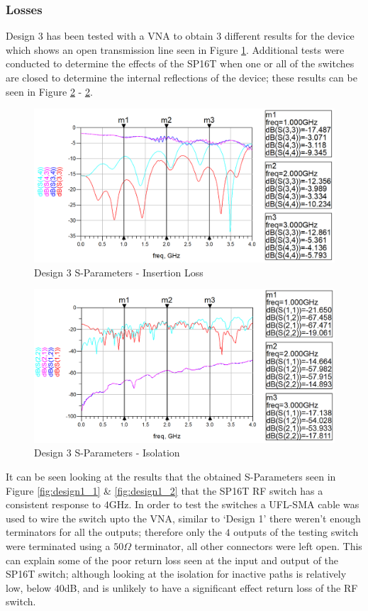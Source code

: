 \documentclass[12pt,openany,a4paper]{book}
\begin{document}
\subsubsection{Losses}
Design 3 has been tested with a VNA to obtain $3$ different results for the device which shows an open transmission line seen in Figure \ref{fig:design3_1}. Additional tests were conducted to determine the effects of the SP16T when one or all of the switches are closed to determine the internal reflections of the device; these results can be seen in Figure \ref{fig:design3_2} - \ref{fig:design3_2}. 
\begin{figure}[H]
	\centering
	\includegraphics[width=1\textwidth]{design3-open.png}
	\caption{Design 3 S-Parameters - Insertion Loss}
	\label{fig:design3_1}
\end{figure} 
\begin{figure}[H]
	\centering
	\includegraphics[width=1\textwidth]{design3.png}
	\caption{Design 3 S-Parameters - Isolation}
	\label{fig:design3_2}
\end{figure} 
It can be seen looking at the results that the obtained S-Parameters seen in Figure \ref{fig:design1_1} \& \ref{fig:design1_2} that the SP16T RF switch has a consistent response to $4$GHz. In order to test the switches a UFL-SMA cable was used to wire the switch upto the VNA, similar to `Design 1' there weren't enough terminators for all the outputs; therefore only the $4$ outputs of the testing switch were terminated using a $50\Omega$ terminator, all other connectors were left open. This can explain some of the poor return loss seen at the input and output of the SP16T switch; although looking at the isolation for inactive paths is relatively low, below $40$dB, and is unlikely to have a significant effect return loss of the RF switch.\\ 
\end{document}
